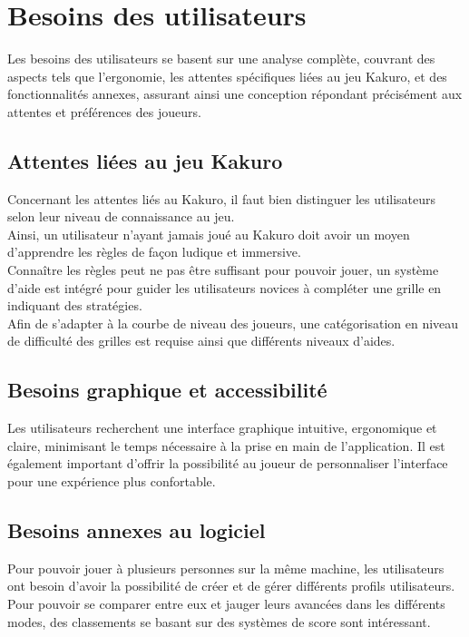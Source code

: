 \newpage\wPt\vspace{-2.5cm}
\section{Besoins des utilisateurs}
Les besoins des utilisateurs se basent sur une analyse complète, couvrant des aspects tels que l'ergonomie, les attentes spécifiques liées au jeu Kakuro, et des fonctionnalités annexes, assurant ainsi une conception répondant précisément aux attentes et préférences des joueurs.

\subsection{Attentes liées au jeu Kakuro}
Concernant les attentes liés au Kakuro, il faut bien distinguer les utilisateurs selon leur niveau de connaissance au jeu. \\
Ainsi, un utilisateur n'ayant jamais joué au Kakuro doit avoir un moyen d'apprendre les règles de façon ludique et immersive.\\
Connaître les règles peut ne pas être suffisant pour pouvoir jouer, un système d'aide est intégré pour guider les utilisateurs novices à compléter une grille en indiquant des stratégies.\\
Afin de s'adapter à la courbe de niveau des joueurs, une catégorisation en niveau de difficulté des grilles est requise ainsi que différents niveaux d'aides.\\

\subsection{Besoins graphique et accessibilité}
Les utilisateurs recherchent une interface graphique intuitive, ergonomique et claire, minimisant le temps nécessaire à la prise en main de l'application. Il est également important d'offrir la possibilité au joueur de personnaliser l'interface pour une expérience plus confortable.

\subsection{Besoins annexes au logiciel}
Pour pouvoir jouer à plusieurs personnes sur la même machine, les utilisateurs ont besoin d'avoir la possibilité de créer et de gérer différents profils utilisateurs. Pour pouvoir se comparer entre eux et jauger leurs avancées dans les différents modes, des classements se basant sur des systèmes de score sont intéressant.